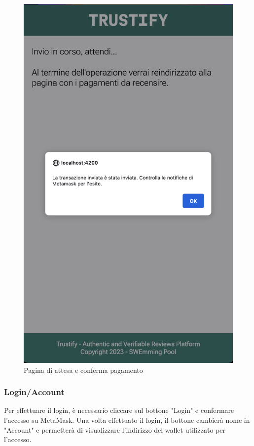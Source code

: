 \begin{figure}[H]
      \includegraphics[width=\linewidth]{src/img/checkout_conferma.png}
      \caption{Pagina di attesa e conferma pagamento}\label{fig:checkout_conferma}
    \endminipage
\end{figure}

\subsubsection{Login/Account}
Per effettuare il login, è necessario cliccare sul bottone "Login" e confermare l'accesso su MetaMask. Una volta effettuato il login, il bottone cambierà nome in "Account" e permetterà di visualizzare l'indirizzo del wallet utilizzato per l'accesso.

